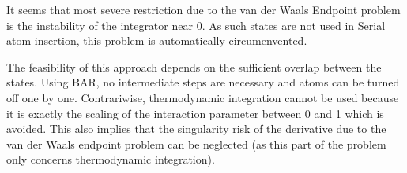 It seems that most severe restriction due to the van der Waals Endpoint
problem is the instability of the integrator near $0$. As such states
are not used in Serial atom insertion, this problem is automatically
circumenvented.

The feasibility of this approach depends on the sufficient overlap
between the states. Using BAR, no intermediate steps are necessary
and atoms can be turned off one by one. Contrariwise, thermodynamic
integration cannot be used because it is exactly the scaling of the
interaction parameter between 0 and 1 which is avoided. This also
implies that the singularity risk of the derivative due to the van
der Waals endpoint problem can be neglected (as this part of the problem
only concerns thermodynamic integration).